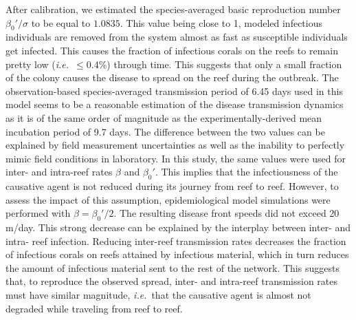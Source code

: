 \documentclass[utf8]{frontiersSCNS}
\newcommand{\ie}{{\it i.e.}\ }
\begin{document}

After calibration, we estimated the species-averaged basic reproduction number $\beta_0'/\sigma$ to be equal to $1.0835$. This value being close to 1, modeled infectious individuals are removed from the system almost as fast as susceptible individuals get infected. This causes the fraction of infectious corals on the reefs to remain pretty low (\ie $\leq 0.4\%$) through time. This suggests that only a small fraction of the colony causes the disease to spread on the reef during the outbreak. The observation-based species-averaged transmission period of 6.45 days used in this model seems to be a reasonable estimation of the disease transmission dynamics as it is of the same order of magnitude as the experimentally-derived mean incubation period of 9.7 days. The difference between the two values can be explained by field measurement uncertainties as well as the inability to perfectly mimic field conditions in laboratory. In this study, the same values were used for inter- and intra-reef rates $\beta$ and $\beta_0'$. This implies that the infectiousness of the causative agent is not reduced during its journey from reef to reef. However, to assess the impact of this assumption, epidemiological model simulations were performed with $\beta=\beta_0'/2$. The resulting disease front speeds did not exceed 20 m/day. This strong decrease can be explained by the interplay between inter- and intra- reef infection. Reducing inter-reef transmission rates decreases the fraction of infectious corals on reefs attained by infectious material, which in turn reduces the amount of infectious material sent to the rest of the network. This suggests that, to reproduce the observed spread, inter- and intra-reef transmission rates must have similar magnitude, \ie that the causative agent is almost not degraded while traveling from reef to reef.

\end{document}
